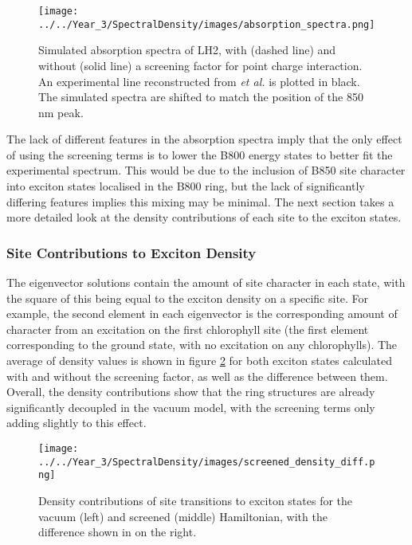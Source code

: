 \begin{figure}
    \centering
    \texttt{[image: ../../Year\_3/SpectralDensity/images/absorption\_spectra.png]}
    \label{fig:LH2_abs_spec}
    \caption{Simulated absorption spectra of LH2, with (dashed line) and without 
    (solid line) a screening factor for point charge interaction. An experimental
    line reconstructed from \emph{et al.} is plotted in black. The simulated spectra
    are shifted to match the position of the 850 nm peak.}
\end{figure}

The lack of different features in the absorption spectra imply that the only effect
of using the screening terms is to lower the B800 energy states to better fit the
experimental spectrum. This would be due to the inclusion of B850 site character
into exciton states localised in the B800 ring, but the lack of significantly differing
features implies this mixing may be minimal. The next section takes a more detailed
look at the density contributions of each site to the exciton states.

\subsubsection{Site Contributions to Exciton Density}
\label{subsubsec:site_dens}

The eigenvector solutions contain the amount of site character in each state, with
the square of this being equal to the exciton density on a specific site. For example,
the second element in each eigenvector is the corresponding amount of character 
from an excitation on the first chlorophyll site (the first element corresponding
to the ground state, with no excitation on any chlorophylls). The average of density
values is shown in figure \ref{fig:LH2_density} for both exciton states calculated
with and without the screening factor, as well as the difference between them. 
Overall, the density contributions show that the ring structures are already significantly
decoupled in the vacuum model, with the screening terms only adding slightly to 
this effect.

\begin{figure}
    \centering
    \texttt{[image: ../../Year\_3/SpectralDensity/images/screened\_density\_diff.png]}
    \label{fig:LH2_density}
    \caption{Density contributions of site transitions to exciton states for the
    vacuum (left) and screened (middle) Hamiltonian, with the difference shown in
    on the right.}
\end{figure}


